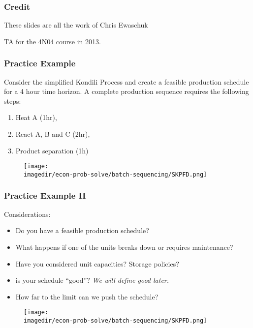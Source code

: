 \begin{frame}\frametitle{Credit} These slides are all the work of Chris Ewaschuk
	
	\vspace{12pt} TA for the 4N04 course in 2013. 
\end{frame}

\begin{frame}\frametitle{Practice Example}
	Consider the simplified Kondili Process and create a feasible production schedule for a 4 hour time horizon. A complete production sequence requires the following steps: 
	\begin{enumerate}
		\item	Heat A (1hr), 
		\item	React A, B and C (2hr), 
		\item	Product separation (1h) 
	\end{enumerate}
	\begin{figure}
		[!htb] 
		\begin{center}
			\texttt{[image: \\imagedir/econ-prob-solve/batch-sequencing/SKPFD.png]}
			
			\label{fig:SKPFD} 
		\end{center}
	\end{figure}
\end{frame}

\begin{frame}\frametitle{Practice Example II}
	Considerations: 
	\begin{itemize}
		\item	Do you have a feasible production schedule? 
		\item	What happens if one of the units breaks down or requires maintenance? 
		\item	Have you considered unit capacities? Storage policies? 
		\item	is your schedule ``good''? {\scriptsize \emph{We will define good later. }}
		\item	How far to the limit can we push the schedule? 
	\end{itemize}
	\begin{figure}
		[!htb] 
		\begin{center}
			\texttt{[image: \\imagedir/econ-prob-solve/batch-sequencing/SKPFD.png]}
			\label{fig:SKPFD2} 
		\end{center}
	\end{figure}
\end{frame}

